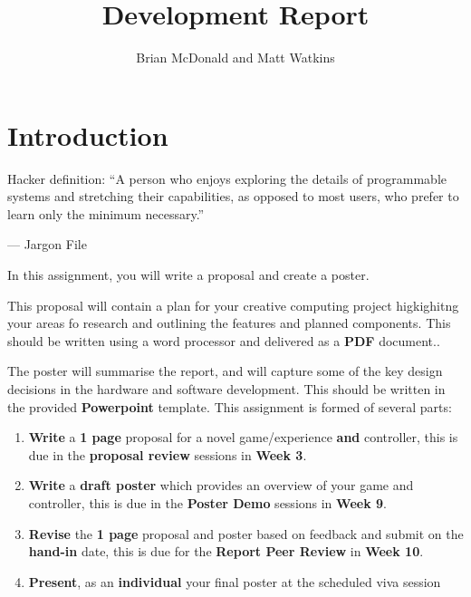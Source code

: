\documentclass{../../fal_assignment}
\title{Development Report}
\author{Brian McDonald and Matt Watkins}
\begin{document}
\maketitle

\section*{Introduction}

\begin{marginquote}
Hacker definition: ``A person who enjoys exploring the details of programmable systems and stretching their capabilities, as opposed to most users, who prefer to learn only the minimum necessary.''

--- Jargon File

\end{marginquote}

In this assignment, you will write a proposal and create a poster. 

This proposal will contain a plan for your creative computing project higkighitng your areas fo research and outlining the features and planned components.	This should be written using a word processor and delivered as a \textbf{PDF} document..

The poster will summarise the report, and will capture some of the key design decisions in the 
hardware and software development. This should be written in the provided \textbf{Powerpoint} template.
This assignment is formed of several parts:

\begin{enumerate}[label=(\Alph*)]
    \item \textbf{Write} a \textbf{1 page} proposal for a novel game/experience \textbf{and} controller, this is due in the \textbf{proposal review} sessions in \textbf{Week 3}. 
	\item \textbf{Write} a \textbf{draft poster} which provides an overview of your game and controller, this is due in the \textbf{Poster Demo} sessions in \textbf{Week 9}. 
	\item \textbf{Revise} the \textbf{1 page} proposal and poster based on feedback and submit on the \textbf{hand-in} date, this is due for the \textbf{Report Peer Review} in \textbf{Week 10}. 
	\item \textbf{Present}, as an \textbf{individual} your final poster at the scheduled viva session
\end{enumerate}
\end{document}
